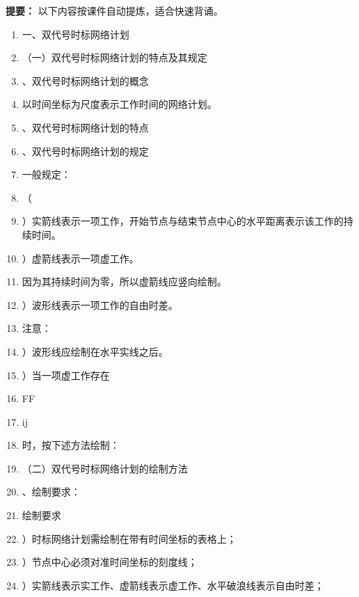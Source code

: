 \documentclass[UTF8,fontset=fandol,11pt]{ctexart}
\begin{document}

\begin{mainbox}

\textbf{提要：} 以下内容按课件自动提炼，适合快速背诵。

\end{mainbox}

\begin{enumerate}[label=\arabic*.]

\item 一、双代号时标网络计划

\item （一）双代号时标网络计划的特点及其规定

\item 、双代号时标网络计划的概念

\item 以时间坐标为尺度表示工作时间的网络计划。

\item 、双代号时标网络计划的特点

\item 、双代号时标网络计划的规定

\item 一般规定：

\item （

\item ）实箭线表示一项工作，开始节点与结束节点中心的水平距离表示该工作的持续时间。

\item ）虚箭线表示一项虚工作。

\item 因为其持续时间为零，所以虚箭线应竖向绘制。

\item ）波形线表示一项工作的自由时差。

\item 注意：

\item ）波形线应绘制在水平实线之后。

\item ）当一项虚工作存在

\item FF

\item ij

\item 时，按下述方法绘制：

\item （二）双代号时标网络计划的绘制方法

\item 、绘制要求：

\item 绘制要求

\item ）时标网络计划需绘制在带有时间坐标的表格上；

\item ）节点中心必须对准时间坐标的刻度线；

\item ）实箭线表示实工作、虚箭线表示虚工作、水平破浪线表示自由时差；

\end{enumerate}
\end{document}
